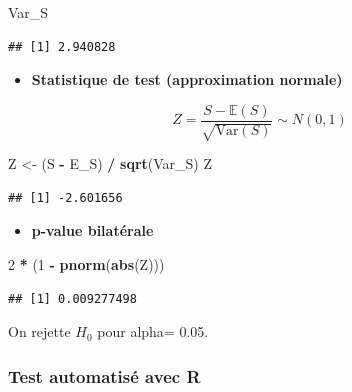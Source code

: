 \documentclass[
  12pt,
]{article}
\newenvironment{Shaded}{\begin{snugshade}}{\end{snugshade}}
\newcommand{\DecValTok}[1]{\textcolor[rgb]{0.00,0.00,0.81}{#1}}
\newcommand{\FunctionTok}[1]{\textcolor[rgb]{0.13,0.29,0.53}{\textbf{#1}}}
\newcommand{\NormalTok}[1]{#1}
\newcommand{\OtherTok}[1]{\textcolor[rgb]{0.56,0.35,0.01}{#1}}
\newcommand{\SpecialCharTok}[1]{\textcolor[rgb]{0.81,0.36,0.00}{\textbf{#1}}}
\providecommand{\tightlist}{%
  \setlength{\itemsep}{0pt}\setlength{\parskip}{0pt}}
\begin{document}
\begin{Shaded}
\begin{Highlighting}[]
\NormalTok{Var\_S}
\end{Highlighting}
\end{Shaded}

\begin{verbatim}
## [1] 2.940828
\end{verbatim}

\begin{itemize}
\tightlist
\item
  \textbf{Statistique de test (approximation normale)}
\end{itemize}

\[
Z = \frac{S - \mathbb{E}(S)}{\sqrt{\text{Var}(S)}} \sim N(0, 1)
\]

\begin{Shaded}
\begin{Highlighting}[]
\NormalTok{Z }\OtherTok{\textless{}{-}}\NormalTok{ (S }\SpecialCharTok{{-}}\NormalTok{ E\_S) }\SpecialCharTok{/} \FunctionTok{sqrt}\NormalTok{(Var\_S)}
\NormalTok{Z}
\end{Highlighting}
\end{Shaded}

\begin{verbatim}
## [1] -2.601656
\end{verbatim}

\begin{itemize}
\tightlist
\item
  \textbf{p-value bilatérale}
\end{itemize}

\begin{Shaded}
\begin{Highlighting}[]
\DecValTok{2} \SpecialCharTok{*}\NormalTok{ (}\DecValTok{1} \SpecialCharTok{{-}} \FunctionTok{pnorm}\NormalTok{(}\FunctionTok{abs}\NormalTok{(Z)))}
\end{Highlighting}
\end{Shaded}

\begin{verbatim}
## [1] 0.009277498
\end{verbatim}

On rejette \(H_0\) pour alpha= 0.05.

\subsubsection{Test automatisé avec R}\label{test-automatisuxe9-avec-r}
\end{document}

